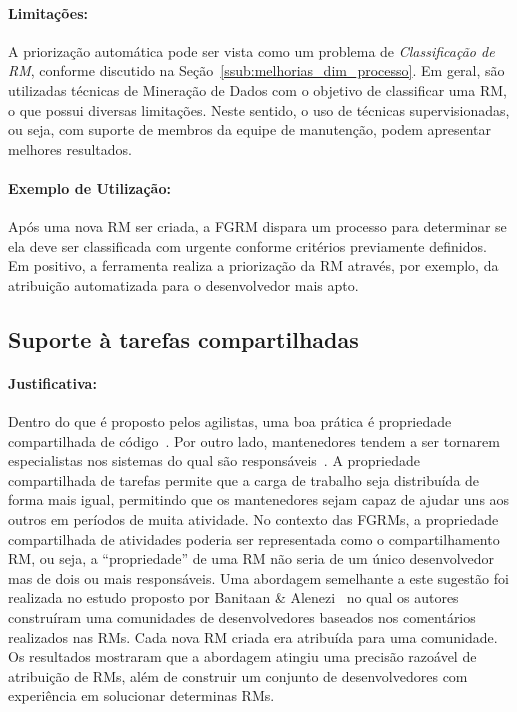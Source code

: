 \paragraph{Limitações:}
\label{par:limitacoes_s07}

A priorização automática pode ser vista como um problema de
\textit{Classificação de RM}, conforme discutido na
Seção~\ref{ssub:melhorias_dim_processo}. Em geral, são utilizadas técnicas de
Mineração de Dados com o objetivo de classificar uma RM, o que possui diversas
limitações. Neste sentido, o uso de técnicas supervisionadas, ou seja, com
suporte de membros da equipe de manutenção, podem apresentar melhores
resultados.

\paragraph{Exemplo de Utilização:}
\label{par:exemplo_de_utilização_s07}

Após uma nova RM ser criada, a FGRM dispara um processo para determinar se ela
deve ser classificada com urgente conforme critérios previamente definidos. Em
positivo, a ferramenta realiza a priorização da RM através, por exemplo, da
atribuição automatizada para o desenvolvedor mais apto.

\subsection{Suporte à tarefas compartilhadas}
\label{sub:suporte_tarefas_compartilhadas}


\paragraph{Justificativa:}
\label{par:justificativa_s08}

Dentro do que é proposto pelos agilistas, uma boa prática é propriedade
compartilhada de código~\cite{meyer2014agile}. Por outro lado, mantenedores
tendem a ser tornarem especialistas nos sistemas do qual são
responsáveis~\cite{singer1998practices}. A propriedade compartilhada de tarefas
permite que a carga de trabalho seja distribuída de forma mais igual, permitindo
que os mantenedores sejam capaz de ajudar uns aos outros em períodos de muita
atividade. No contexto das FGRMs, a propriedade compartilhada de atividades
poderia ser representada como o compartilhamento RM, ou seja, a ``propriedade''
de uma RM não seria de um único desenvolvedor mas de dois ou mais responsáveis.
Uma abordagem semelhante a este sugestão foi realizada no estudo proposto por
Banitaan \& Alenezi~\cite{banitaan2013decoba} no qual os autores construíram uma
comunidades de desenvolvedores baseados nos comentários realizados nas RMs. Cada
nova RM criada era atribuída para uma comunidade. Os resultados mostraram que a
abordagem atingiu uma precisão razoável de atribuição de RMs, além de construir
um conjunto de desenvolvedores com experiência em solucionar determinas RMs.

